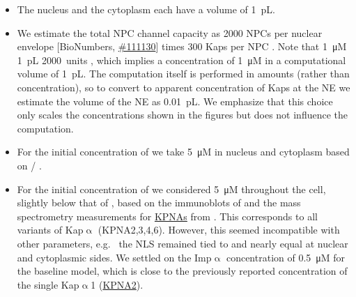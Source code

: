 \documentclass[12pt,notitlepage]{article}
\def\[#1\]{\begin{align}#1\end{align}}
\begin{document}
\begin{itemize}

\item

The nucleus and the cytoplasm each have a volume
of \SI{1}{\pico L}.


\item

We estimate the total NPC channel capacity
as 
2000 NPCs per nuclear envelope
[BioNumbers, \href{https://bionumbers.hms.harvard.edu/bionumber.aspx?id=111130}{\#111130}]
times
300 Kaps per NPC
\cite[\href{https://i.ibb.co/8jdLvn1/Paradise-Levin-Korza-Carson-2007-Fig7.jpg}{Fig.~7}]{ParadiseETAL2007}.
%
%
Note that 
\[
	\label{e:NPC-volume}
	\SI{1}{\micro M} \times \SI{1}{\pico L} 
	 \times \SI{2000}{units}
	,	
\]
which implies a concentration of \SI{1}{\micro M}
in a computational volume of \SI{1}{\pico L}.
%
%
%
The computation itself is performed in amounts
(rather than concentration),
so to convert to apparent concentration
of Kaps at the NE
we estimate
the volume of the NE as \SI{0.01}{\pico L}.
%
We emphasize that this choice only scales
the concentrations 
shown in the figures
but does not influence the computation.


\item

For the initial concentration of 
we take
\SI{5}{\micro M}
in nucleus and cytoplasm
based on
\cite[\href{https://i.ibb.co/1mNP2XT/Kalita-Kapinos-Lim2021-Fig4.png}{Fig.~4}]{KalitaKapinosLim2021} / 
\cite[\href{https://i.ibb.co/0nLsTZv/Screenshot-from-2022-01-28-15-03-10.png}{Fig.~4a}]{NguyenPappireddiWuhr2019}.
%



\item

For the initial concentration of 
we considered 
\SI{5}{\micro M} throughout the cell,
slightly below that of ,
based on
%
the immunoblots of
\cite[\href{https://i.ibb.co/1z0YJ0T/Screenshot-from-2022-01-28-10-49-23.png}{Fig.~7}]{ZienkiewiczETAL2013}
%
and the mass spectrometry measurements for 
\href{https://www.genecards.org/Search/Symbol?queryString=KPNA*}{KPNAs}
from
\cite[Table~S5]{WuhrETAL2014}.
%
This corresponds to all variants of Kap$\upalpha$ (KPNA2,3,4,6).
%
%
However,
this seemed incompatible with other parameters,
e.g.~%
the NLS remained tied to 
and nearly equal at nuclear and cytoplasmic sides.
%
%
We settled on the {Imp$\upalpha$} concentration of \SI{0.5}{\micro M}
for the baseline model,
which is close to the previously reported concentration
of the single Kap$\upalpha$1 (\href{https://www.genecards.org/cgi-bin/carddisp.pl?gene=KPNA2}{KPNA2}).


\end{itemize}
\end{document}
